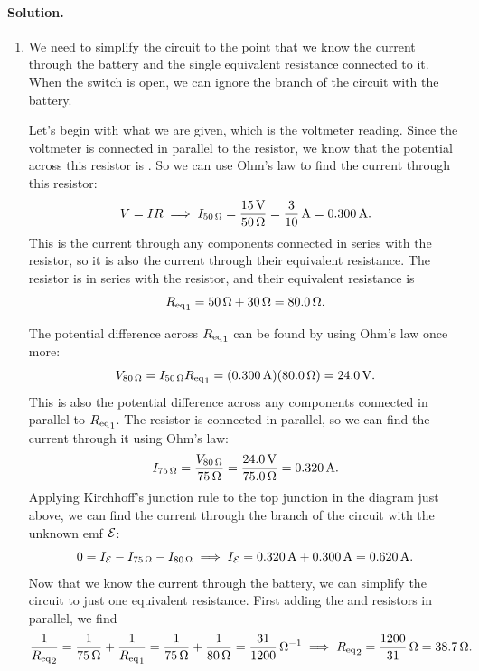 \documentclass[11pt]{article}
\newcommand{\beq}{\begin{equation*}}
\newcommand{\eeq}{\end{equation*}}
\newenvironment{solution}
{
    \paragraph{Solution.}
    \ignorespaces
}
{
    \bigskip
}
\begin{document}
\begin{solution}
	\begin{enumerate}
		\item We need to simplify the circuit to the point that we know the current through the battery and the single equivalent resistance connected to it.  When the switch is open, we can ignore the branch of the circuit with the  battery.
		
		\vspace{1.5in}
		
		Let's begin with what we are given, which is the voltmeter reading.  Since the voltmeter is connected in parallel to the  resistor, we know that the potential across this resistor is .  So we can use Ohm's law to find the current through this resistor:
		\beq
			V = I R
			\implies
			I_{\Sohm{50}} = \frac{\Svolt{15}}{\Sohm{50}}
			= \frac{3}{10}\,\si{\ampere}
			= \Samp{0.300}.
		\eeq
		This is the current through any components connected in series with the  resistor, so it is also the current through their equivalent resistance.  The  resistor is in series with the  resistor, and their equivalent resistance is
		\beq
			{\Req}_1 = \Sohm{50} + \Sohm{30}
			= \Sohm{80.0}.
		\eeq
		
		\vspace{1.5in}
		
		The potential difference across ${R_\text{eq}}_1$ can be found by using Ohm's law once more:
		\beq
			V_{\Sohm{80}} = I_{\Sohm{50}} {\Req}_1 = (\Samp{0.300}) (\Sohm{80.0}) = \Svolt{24.0}.
		\eeq
		This is also the potential difference across any components connected in parallel to ${R_\text{eq}}_1$.  The  resistor is connected in parallel, so we can find the current through it using Ohm's law:
		\beq
			I_{\Sohm{75}} = \frac{V_{\Sohm{80}}}{\Sohm{75}}
			= \frac{\Svolt{24.0}}{\Sohm{75.0}}
			= \Samp{0.320}.
		\eeq
		Applying Kirchhoff's junction rule to the top junction in the diagram just above, we can find the current through the branch of the circuit with the unknown emf $\mathcal{E}$:
		\beq
			0 = I_\cE - I_{\Sohm{75}} - I_{\Sohm{80}}
			\implies
			I_\cE = \Samp{0.320} + \Samp{0.300}
			= \Samp{0.620}.
		\eeq
		Now that we know the current through the battery, we can simplify the circuit to just one equivalent resistance.  First adding the  and  resistors in parallel, we find
		\beq
			\frac{1}{{\Req}_2} = \frac{1}{\Sohm{75}} + \frac{1}{{\Req}_1}
			= \frac{1}{\Sohm{75}} + \frac{1}{\Sohm{80}}
			= \frac{31}{1200}\,\si{\per\ohm}
			\implies
			{\Req}_2 = \frac{1200}{31}\,\si{\ohm}
			= \Sohm{38.7}.
		\eeq
		

\end{enumerate}
\end{solution}
\end{document}
